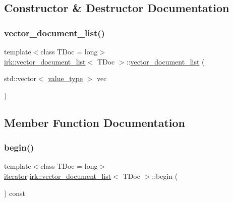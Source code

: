 \subsection{Constructor \& Destructor Documentation}
\mbox{\label{classirk_1_1vector__document__list_aee7fc8d2b55075dca80eb883fe5cd0dc}} 
\subsubsection{\texorpdfstring{vector\+\_\+document\+\_\+list()}{vector\_document\_list()}}
{\footnotesize\ttfamily template$<$class T\+Doc  = long$>$ \\
\mbox{\hyperlink{classirk_1_1vector__document__list}{irk\+::vector\+\_\+document\+\_\+list}}$<$ T\+Doc $>$\+::\mbox{\hyperlink{classirk_1_1vector__document__list}{vector\+\_\+document\+\_\+list}} (\begin{DoxyParamCaption}\item[{std\+::vector$<$ \mbox{\hyperlink{classirk_1_1vector__document__list_a0ec9c56f5e12a3a9101b5a18b2fbe69f}{value\+\_\+type}} $>$}]{vec }\end{DoxyParamCaption})\hspace{0.3cm}{\ttfamily [inline]}}



\subsection{Member Function Documentation}
\mbox{\label{classirk_1_1vector__document__list_a014b3737e63a4472e66ccb90a515f340}} 
\subsubsection{\texorpdfstring{begin()}{begin()}}
{\footnotesize\ttfamily template$<$class T\+Doc  = long$>$ \\
\mbox{\hyperlink{classirk_1_1vector__document__list_a42499af78a7d66a1b626858cd424600f}{iterator}} \mbox{\hyperlink{classirk_1_1vector__document__list}{irk\+::vector\+\_\+document\+\_\+list}}$<$ T\+Doc $>$\+::begin (\begin{DoxyParamCaption}{ }\end{DoxyParamCaption}) const\hspace{0.3cm}{\ttfamily [inline]}}

